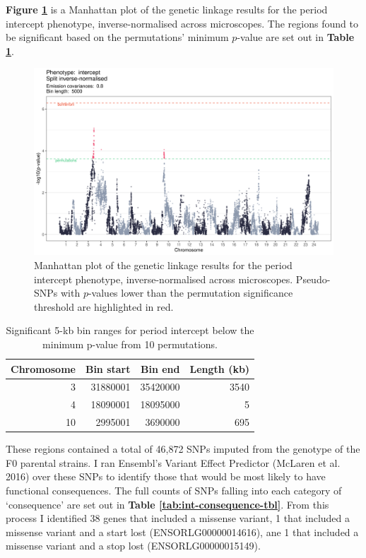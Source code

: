 \documentclass[
]{book}
\begin{document}
\textbf{Figure \ref{fig:somite-manhattan}} is a Manhattan plot of the genetic linkage results for the period intercept phenotype, inverse-normalised across microscopes. The regions found to be significant based on the permutations' minimum \(p\)-value are set out in \textbf{Table \ref{tab:somite-sig-int-tbl}}.



\begin{figure}
\includegraphics[width=1\linewidth]{figs/somites/manhattan_intercept} \caption{Manhattan plot of the genetic linkage results for the period intercept phenotype, inverse-normalised across microscopes. Pseudo-SNPs with \(p\)-values lower than the permutation significance threshold are highlighted in red.}\label{fig:somite-manhattan}
\end{figure}

\begin{table}

\caption{\label{tab:somite-sig-int-tbl}Significant 5-kb bin ranges for period intercept below the minimum p-value from 10 permutations.}
\centering
\begin{tabular}[t]{r|r|r|r}
\hline
Chromosome & Bin start & Bin end & Length (kb)\\
\hline
3 & 31880001 & 35420000 & 3540\\
\hline
4 & 18090001 & 18095000 & 5\\
\hline
10 & 2995001 & 3690000 & 695\\
\hline
\end{tabular}
\end{table}

These regions contained a total of 46,872 SNPs imputed from the genotype of the F0 parental strains.
I ran Ensembl's Variant Effect Predictor (McLaren et al. 2016) over these SNPs to identify those that would be most likely to have functional consequences. The full counts of SNPs falling into each category of `consequence' are set out in \textbf{Table \ref{tab:int-consequence-tbl}}. From this process I identified 38 genes that included a missense variant, 1 that included a missense variant and a start lost (ENSORLG00000014616), ane 1 that included a missense variant and a stop lost (ENSORLG00000015149).
\end{document}
